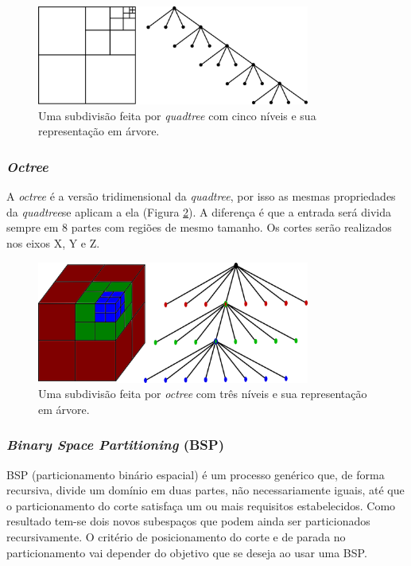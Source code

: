  \begin{figure}[htbp]
     \centering
     \includegraphics[width=0.8\textwidth]{fig/quadtree_tree.png}
     \caption{Uma subdivisão feita por \textit{quadtree} com cinco níveis e sua representação em árvore.} 
     \label{fig:quadtree_tree}
 \end{figure}

\subsubsection{\textit{Octree}} 

A \textit{octree} é a versão tridimensional da \textit{quadtree}, por isso as mesmas propriedades da \textit{quadtree}se aplicam a ela (Figura \ref{fig:octree_tree}). A diferença é que a entrada será divida sempre em 8 partes com regiões de mesmo tamanho. Os cortes serão realizados nos eixos X, Y e Z.	


 \begin{figure}[htbp]
     \centering
     \includegraphics[width=0.8\textwidth]{fig/octree_tree.png}
     \caption{Uma subdivisão feita por \textit{octree} com três níveis e sua representação em árvore.} 
     \label{fig:octree_tree}
 \end{figure}

\subsubsection{\textit{Binary Space Partitioning} (BSP)}


BSP (particionamento binário espacial) é um processo genérico que, de forma recursiva, divide um domínio em duas partes, não necessariamente iguais, até que o particionamento do corte satisfaça um ou mais requisitos estabelecidos. Como resultado tem-se dois novos subespaços que podem ainda ser particionados recursivamente. O critério de posicionamento do corte e de parada no particionamento vai depender do objetivo que se deseja ao usar uma BSP. 

